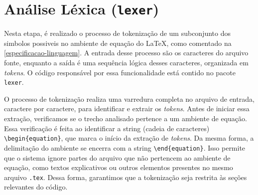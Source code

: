 %
%
%
%
%
%


\section{Análise Léxica (\texttt{lexer})} \label{section-lexer}

Nesta etapa, é realizado o processo de tokenização de um subconjunto dos simbolos possiveis no ambiente de equação do \LaTeX{}, como comentado na \autoref{especificacao-linguagem}. A entrada desse processo são os caracteres do arquivo fonte, enquanto a saída é uma sequência lógica desses caracteres, organizada em \textit{tokens}. O código responsável por essa funcionalidade está contido no pacote \texttt{lexer}.

O processo de tokenização realiza uma varredura completa no arquivo de entrada, caractere por caractere, para identificar e extrair os \textit{tokens}. Antes de iniciar essa extração, verificamos se o trecho analisado pertence a um ambiente de equação. Essa verificação é feita ao identificar a string (cadeia de caracteres) \verb|\begin{equation}|, que marca o início da extração de \textit{tokens}. Da mesma forma, a delimitação do ambiente se encerra com a string \verb|\end{equation}|. Isso permite que o sistema ignore partes do arquivo que não pertencem ao ambiente de equação, como textos explicativos ou outros elementos presentes no mesmo arquivo \texttt{.tex}. Dessa forma, garantimos que a tokenização seja restrita às seções relevantes do código.

